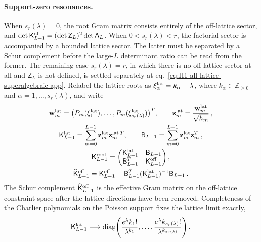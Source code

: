 \documentclass[a4paper,11pt]{article}
\def\ee{e}%
\theoremstyle{definition}
\theoremstyle{remark}
\newcommand{\ee}{\mathrm e}
\newcommand{\diag}{\operatorname{diag}}
\begin{document}
\paragraph{Support-zero resonances.}
When \(s_r(\lambda)=0\), the root Gram matrix consists entirely of
the off-lattice sector, and
\(\det\mathsf K_{L-1}^{\rm off}
=(\det\mathsf Z_L)^2\det\mathsf A_L\).
When \(0<s_r(\lambda)<r\), the factorial sector is accompanied by a
bounded lattice sector. The latter must be separated by a Schur complement before the
large-$L$ determinant ratio can be read from the former. The remaining case
$s_r(\lambda)=r$, in which there is no off-lattice sector at all and $\mathsf Z_L$ is not defined,
is settled separately at eq.~\eqref{eq:H1-all-lattice-superalgebraic-app}. Relabel the lattice roots as
\(\xi_\alpha^{\rm lat}=k_\alpha-\lambda\), where
\(k_\alpha\in\mathbb Z_{\ge0}\) and
\(\alpha=1,\ldots,s_r(\lambda)\), and write 
\begin{equation}
\begin{gathered}
   \mathbf w_m^{\rm lat}
   =
   \bigl(P_m(\xi_1^{\rm lat}),\ldots,
   P_m(\xi_{s_r(\lambda)}^{\rm lat})\bigr)^T,
   \qquad
   \mathbf z_m^{\rm lat}
   =\frac{\mathbf w_m^{\rm lat}}{\sqrt{h_m}}\,,\\
   \mathsf K_{L-1}^{\rm lat}
   =
   \sum_{m=0}^{L-1}
   \mathbf z_m^{\rm lat}\mathbf z_m^{{\rm lat}\,T},
   \qquad
   \mathsf B_{L-1}
   =\sum_{m=0}^{L-1}
   \mathbf z_m^{\rm lat}\mathbf z_m^T\,,\\
   \mathsf K_{L-1}^{\rm root}
   =
   \begin{pmatrix}
      \mathsf K_{L-1}^{\rm lat}&\mathsf B_{L-1}\\
      \mathsf B_{L-1}^T&\mathsf K_{L-1}^{\rm off}
   \end{pmatrix},\\
   \widehat{\mathsf K}_{L-1}^{\rm off}
   =
   \mathsf K_{L-1}^{\rm off}
   -\mathsf B_{L-1}^T
   (\mathsf K_{L-1}^{\rm lat})^{-1}
   \mathsf B_{L-1}\,.
\end{gathered}
   \label{eq:H1-mixed-root-Schur-app}
\end{equation}
The Schur complement
\(\widehat{\mathsf K}_{L-1}^{\rm off}\) is the effective Gram matrix
on the off-lattice constraint space after the lattice directions have
been removed. Completeness of the Charlier polynomials on the Poisson
support fixes the lattice limit exactly,
\begin{equation}
   \mathsf K_{L-1}^{\rm lat}
   \longrightarrow
   \diag\!\left(
      \frac{\ee^\lambda k_1!}{\lambda^{k_1}},\ldots,
      \frac{\ee^\lambda k_{s_r(\lambda)}!}
      {\lambda^{k_{s_r(\lambda)}}}
   \right).
   \label{eq:H1-lattice-Gram-limit-app}
\end{equation}
\end{document}
